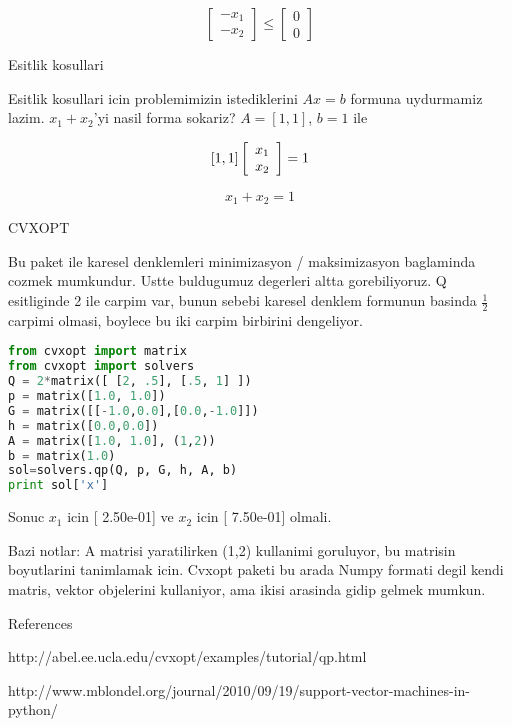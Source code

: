 \documentclass[12pt,fleqn]{article}\usepackage{../common}
\begin{document}
\[ 
\left[ \begin{array}{c}
    -x_1 \\
    -x_2
\end{array} \right]
\leq
\left[ \begin{array}{c}
    0 \\
    0
\end{array} \right]
 \]

Esitlik kosullari

Esitlik kosullari icin problemimizin istediklerini $Ax = b$ formuna uydurmamiz
lazim. $x_1 + x_2$'yi nasil forma sokariz? $A = [1, 1]$, $b = 1$ ile

\[ 
[1, 1] \left[ \begin{array}{c}
    x_1 \\
    x_2
\end{array} \right] 
= 1 \\
 \]

\[ x_1 + x_2 = 1 \]

CVXOPT

Bu paket ile karesel denklemleri minimizasyon / maksimizasyon baglaminda cozmek
mumkundur. Ustte buldugumuz degerleri altta gorebiliyoruz. Q esitliginde 2 ile
carpim var, bunun sebebi karesel denklem formunun basinda $\frac{1}{2}$ carpimi
olmasi, boylece bu iki carpim birbirini dengeliyor.

\begin{lstlisting}[language=Python]
from cvxopt import matrix
from cvxopt import solvers
Q = 2*matrix([ [2, .5], [.5, 1] ])
p = matrix([1.0, 1.0])
G = matrix([[-1.0,0.0],[0.0,-1.0]])
h = matrix([0.0,0.0])
A = matrix([1.0, 1.0], (1,2))
b = matrix(1.0)
sol=solvers.qp(Q, p, G, h, A, b)
print sol['x']
\end{lstlisting}

Sonuc $x_1$ icin [ 2.50e-01] ve $x_2$ icin [ 7.50e-01] olmali.

Bazi notlar: A matrisi yaratilirken (1,2) kullanimi goruluyor, bu matrisin
boyutlarini tanimlamak icin. Cvxopt paketi bu arada Numpy formati degil kendi
matris, vektor objelerini kullaniyor, ama ikisi arasinda gidip gelmek mumkun. 

References

http://abel.ee.ucla.edu/cvxopt/examples/tutorial/qp.html

http://www.mblondel.org/journal/2010/09/19/support-vector-machines-in-python/
\end{document}
